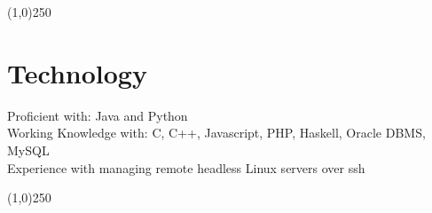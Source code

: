 \documentclass[margin,line, 11pt]{resume}
\begin{document}
\begin{resume}
     



    \vspace{-5mm}
    \line(1,0){250}
    \vspace{-4mm}


   
    \section{\mysidestyle \textbf {Technology} }
    
    Proficient with: Java and Python							\vspace{2mm}\\						
    Working Knowledge with: C, C++, Javascript, PHP, Haskell, Oracle DBMS, MySQL					\vspace{2mm}\\
    Experience with managing remote headless Linux servers over ssh
    
    \vspace{-5mm}
    \line(1,0){250}
    \vspace{-3mm}
    
    



    
    


\end{resume}
\end{document}
